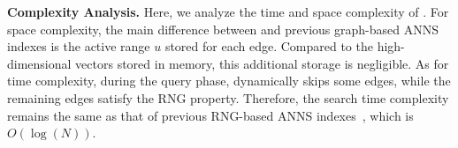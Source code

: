 
\noindent\textbf{Complexity Analysis.} Here, we analyze the time and space complexity of \method. For space complexity, the main difference between \method and previous graph-based ANNS indexes is the active range $u$ stored for each edge. Compared to the high-dimensional vectors stored in memory, this additional storage is negligible. As for time complexity, %
during the query phase, %
\method dynamically skips some edges, while the remaining edges satisfy the RNG property. Therefore, the search time complexity remains the same as that of previous RNG-based ANNS indexes~\cite{wang2021comprehensive}, which is $O(\log(N))$.




